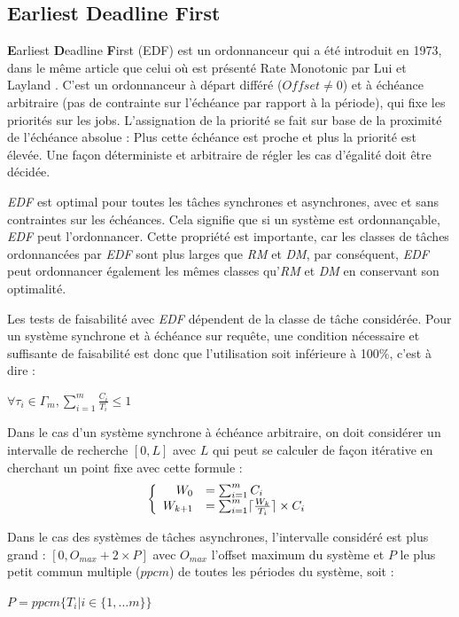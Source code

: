 \documentclass[11pt,a4paper,oneside]{report}
\begin{document}
	\subsection{Earliest Deadline First}
	\textbf{E}arliest \textbf{D}eadline \textbf{F}irst (EDF) est un ordonnanceur 
	qui a été introduit en 1973, dans le même article que celui où est présenté Rate Monotonic 
	par Lui et Layland \cite{liu_scheduling_1973}. C'est un ordonnanceur à départ différé ($Offset \neq 0$) 
	et à échéance arbitraire (pas de contrainte sur l'échéance par rapport à la période), 
	qui fixe les priorités sur les jobs. L'assignation de la priorité se fait sur base de 
	la proximité de l'échéance absolue : Plus cette échéance est proche et plus la priorité est élevée. 
	Une façon déterministe et arbitraire de régler les cas d'égalité doit être décidée.\medskip
	
	\textit{EDF} est optimal pour toutes les tâches synchrones et asynchrones, avec et sans 
	contraintes sur les échéances. 
	Cela signifie que si un système est ordonnançable, \textit{EDF} peut l'ordonnancer.\medskip
	Cette propriété est importante, car les classes de tâches ordonnancées par \textit{EDF} 
	sont plus larges que \textit{RM} et \textit{DM}, par conséquent, \textit{EDF} peut ordonnancer également les 
	mêmes classes qu'\textit{RM} et \textit{DM} en conservant son optimalité. \medskip
	
	Les tests de faisabilité avec \textit{EDF} dépendent de la classe de tâche considérée. 
	Pour un système synchrone et à échéance sur requête, 
	une condition nécessaire et suffisante de faisabilité est donc que l'utilisation soit inférieure 
	à 100\%, c'est à dire : \medskip
	\begin{center}
		$\forall \tau_i \in \Gamma_m, \sum_{i=1}^{m}\frac{C_i}{T_i} \leq 1 $
	\end{center}
	
	Dans le cas d'un système synchrone à échéance arbitraire, on doit considérer un intervalle de 
	recherche $[0, L]$ avec $L$ qui peut se calculer de façon itérative en cherchant un point fixe 
	avec cette formule : \medskip
	\[
	\left \{
	\begin{array}{r l}
	W_0 &= \sum_{i = 1}^{m}C_i\\
	W_{k+1} & =\sum_{i = 1}^{m} \lceil \frac{W_k}{T_i} \rceil \times C_i
	\end{array}
	\right.
	\]
	
	Dans le cas des systèmes de tâches asynchrones, l'intervalle considéré est plus grand : 
	$[0, O_{max} + 2 \times P]$ avec $O_{max}$ l'offset maximum du système et 
	$P$ le plus petit commun multiple ($ppcm$) de toutes les périodes du système, soit : \medskip
	\begin{center}
		$P = ppcm\{T_i | i \in \{1, ... m\}\}$
	\end{center}
	
\end{document}
